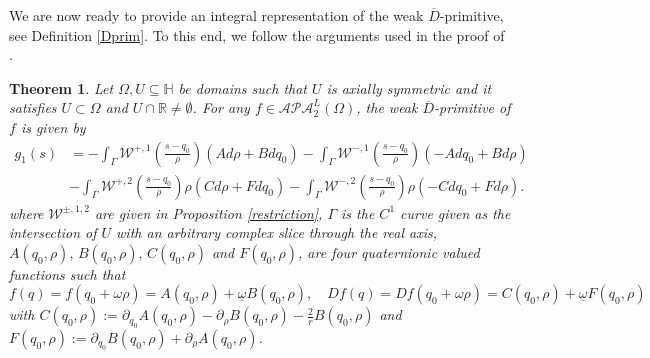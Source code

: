\documentclass[reqno,11pt]{amsart}
\numberwithin{equation}{section}
\newtheorem{theorem}{Theorem}[section]
\theoremstyle{definition}
\begin{document}
We are now ready to provide an integral representation of the weak $\overline{D}$-primitive, see Definition \ref{Dprim}. To this end, we follow the arguments used in the proof of \cite[Thm.~4.2]{CSSinve}.


\begin{theorem}\label{t3}
	Let $\Omega, U\subseteq \mathbb H$ be domains such that $U$ is axially symmetric and it satisfies $U\subset \Omega$ and $U\cap\mathbb R\neq \emptyset$. For any $f\in \mathcal{APA}^L_2(\Omega)$, the weak $\overline D$-primitive of $f$ is given by
	\begin{align*}
		g_1(s)& =-\int_{\Gamma} \mathcal W^{+,1} \left( \frac{s-q_0}{\rho} \right)  (Ad\rho +Bdq_0)-\int_{\Gamma}  \mathcal W^{-,1} \left( \frac{s-q_0}{\rho} \right)   (-Adq_0 +Bd\rho)\\
		&-\int_{\Gamma}  \mathcal W^{+,2} \left( \frac{s-q_0}{\rho} \right) \rho (Cd\rho +Fdq_0)-\int_{\Gamma}  \mathcal W^{-,2} \left( \frac{s-q_0}{\rho} \right) \rho (-Cdq_0 +Fd\rho).
	\end{align*}
	where $\mathcal W^{\pm,1,2}$ are given in Proposition \ref{restriction}, $\Gamma$ is the $C^1$ curve given as the intersection of $U$ with an arbitrary complex slice through the real axis, $A(q_0,\rho),\, B(q_0,\rho),\, C(q_0,\rho)$ and $F(q_0,\rho)$, are four quaternionic valued functions such that
	$$ f(q)=f(q_0+\omega\rho)=A(q_0,\rho)+\underline{\omega} B(q_0,\rho),\quad Df(q)=Df(q_0+\omega\rho)=C(q_0,\rho)+\underline{\omega} F(q_0,\rho) $$
	with $C(q_0,\rho):=\partial_{q_0} A(q_0,\rho)-\partial_\rho B(q_0,\rho)-\frac 2r B(q_0,\rho)$ and $F(q_0,\rho):=\partial_{q_0}B(q_0,\rho)+\partial_\rho A(q_0,\rho)$.
\end{theorem}
\end{document}
